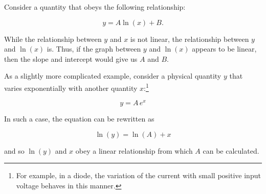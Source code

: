 Consider a quantity that obeys the following relationship:

\begin{equation*}
    y = A \ln(x) + B.
\end{equation*}

While the relationship between $y$ and $x$ is not linear, the relationship between $y$ and $\ln(x)$ is. Thus, if the graph between $y$ and $\ln(x)$ appears to be linear, then the slope and intercept would give us $A$ and $B$.


As a slightly more complicated example, consider a physical quantity $y$ that varies exponentially with another quantity $x$:\footnote{For example, in a diode, the variation of the current with small positive input voltage behaves in this manner.}

\begin{equation*}
    y = A\, e^x
\end{equation*}

In such a case, the equation can be rewritten as 

\begin{equation*}
    \ln(y) = \ln(A) + x
\end{equation*}

and so $\ln(y)$ and $x$ obey a linear relationship from which $A$ can be calculated.







